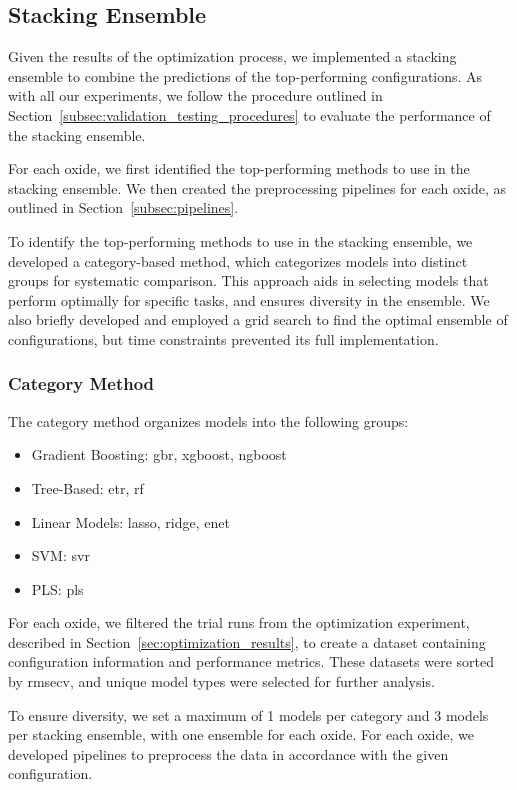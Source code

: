 \subsection{Stacking Ensemble}\label{subsec:stacking_ensemble}
Given the results of the optimization process, we implemented a stacking ensemble to combine the predictions of the top-performing configurations.
As with all our experiments, we follow the procedure outlined in Section~\ref{subsec:validation_testing_procedures} to evaluate the performance of the stacking ensemble.

For each oxide, we first identified the top-performing methods to use in the stacking ensemble.
We then created the preprocessing pipelines for each oxide, as outlined in Section~\ref{subsec:pipelines}.

To identify the top-performing methods to use in the stacking ensemble, we developed a category-based method, which categorizes models into distinct groups for systematic comparison.
This approach aids in selecting models that perform optimally for specific tasks, and ensures diversity in the ensemble.
We also briefly developed and employed a grid search to find the optimal ensemble of configurations, but time constraints prevented its full implementation.

\subsubsection{Category Method}

The category method organizes models into the following groups:

\begin{itemize}
    \item Gradient Boosting: \gls{gbr}, \gls{xgboost}, \gls{ngboost}
    \item Tree-Based: \gls{etr}, \gls{rf}
    \item Linear Models: \gls{lasso}, \gls{ridge}, \gls{enet}
    \item SVM: \gls{svr}
    \item PLS: \gls{pls}
\end{itemize}

For each oxide, we filtered the trial runs from the optimization experiment, described in Section~\ref{sec:optimization_results}, to create a dataset containing configuration information and performance metrics.
These datasets were sorted by \gls{rmsecv}, and unique model types were selected for further analysis.

To ensure diversity, we set a maximum of 1 models per category and 3 models per stacking ensemble, with one ensemble for each oxide.
For each oxide, we developed pipelines to preprocess the data in accordance with the given configuration.

